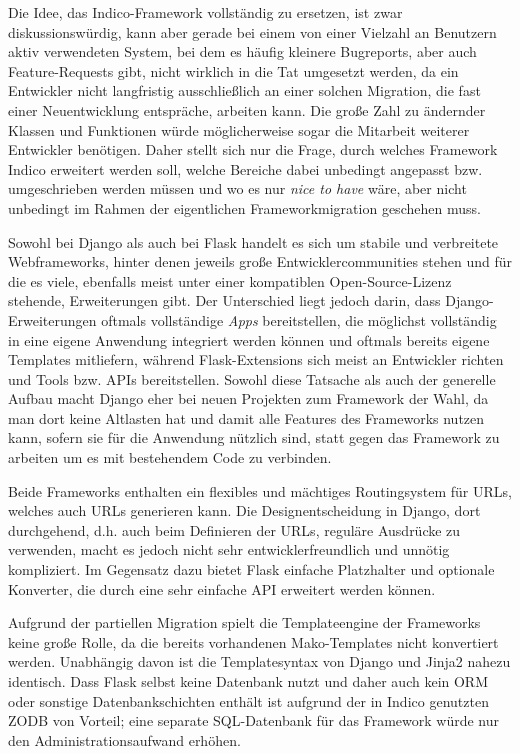 Die Idee, das Indico-Framework vollständig zu ersetzen, ist zwar diskussionswürdig, kann aber gerade
bei einem von einer Vielzahl an Benutzern aktiv verwendeten System, bei dem es häufig kleinere
Bugreports, aber auch Feature-Requests gibt, nicht wirklich in die Tat umgesetzt werden, da ein
Entwickler nicht langfristig ausschließlich an einer solchen Migration, die fast einer
Neuentwicklung entspräche, arbeiten kann. Die große Zahl zu ändernder Klassen und Funktionen würde
möglicherweise sogar die Mitarbeit weiterer Entwickler benötigen. Daher stellt sich nur die Frage,
durch welches Framework Indico erweitert werden soll, welche Bereiche dabei unbedingt angepasst bzw.
umgeschrieben werden müssen und wo es nur \emph{nice to have} wäre, aber nicht unbedingt im Rahmen
der eigentlichen Frameworkmigration geschehen muss.

Sowohl bei Django als auch bei Flask handelt es sich um stabile und verbreitete Webframeworks,
hinter denen jeweils große Entwicklercommunities stehen und für die es viele, ebenfalls meist unter
einer kompatiblen Open-Source-Lizenz stehende, Erweiterungen gibt. Der Unterschied liegt jedoch
darin, dass Django-Erweiterungen oftmals vollständige \emph{Apps} bereitstellen, die möglichst
vollständig in eine eigene Anwendung integriert werden können und oftmals bereits eigene
Templates mitliefern, während Flask-Extensions sich meist an Entwickler richten und Tools bzw. APIs
bereitstellen. Sowohl diese Tatsache als auch der generelle Aufbau macht Django eher bei neuen
Projekten zum Framework der Wahl, da man dort keine Altlasten hat und damit alle Features des
Frameworks nutzen kann, sofern sie für die Anwendung nützlich sind, statt gegen das Framework zu
arbeiten um es mit bestehendem Code zu verbinden.

Beide Frameworks enthalten ein flexibles und mächtiges Routingsystem für URLs, welches auch URLs
generieren kann. Die Designentscheidung in Django, dort durchgehend, d.h. auch beim Definieren der
URLs, reguläre Ausdrücke zu verwenden, macht es jedoch nicht sehr entwicklerfreundlich und unnötig
kompliziert. Im Gegensatz dazu bietet Flask einfache Platzhalter und optionale Konverter, die durch
eine sehr einfache API erweitert werden können.

Aufgrund der partiellen Migration spielt die Templateengine der Frameworks keine große Rolle, da
die bereits vorhandenen Mako-Templates nicht konvertiert werden. Unabhängig davon ist die
Templatesyntax von Django und Jinja2 nahezu identisch. Dass Flask selbst keine Datenbank nutzt und
daher auch kein ORM oder sonstige Datenbankschichten enthält ist aufgrund der in Indico genutzten
ZODB von Vorteil; eine separate SQL-Datenbank für das Framework würde nur den Administrationsaufwand
erhöhen.

